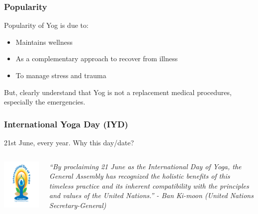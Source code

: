 \begin{frame}[fragile]\frametitle{Popularity}

Popularity of Yog is due to:
	\begin{itemize}
	\item Maintains wellness
	\item As a complementary approach to recover from illness
	\item To manage stress and trauma
	\end{itemize}

But, clearly understand that Yog is not a replacement medical procedures, especially the emergencies.

\end{frame}

\begin{frame}[fragile]\frametitle{International Yoga Day (IYD)}
21st June, every year. Why this day/date?

   \begin{columns}
    \begin{column}[t]{0.4\linewidth}
	
\begin{center}
\includegraphics[width=0.5\linewidth,keepaspectratio]{images/yog16}
\end{center}


    \end{column}
    \begin{column}[t]{0.6\linewidth}
		\begin{center}
		\textit{``By proclaiming 21 June as the International Day of Yoga, the General Assembly has recognized the holistic benefits of this timeless practice and its inherent compatibility with the principles and values of the United Nations.'' -    Ban Ki-moon (United Nations Secretary-General)}
	\end{center}

    \end{column}
  \end{columns}

\end{frame}


